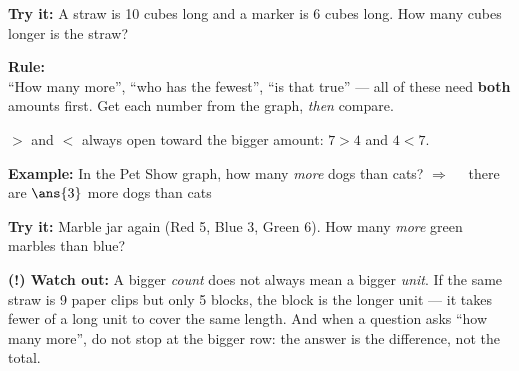 \documentclass[12pt]{article}
\begin{document}
\begin{tryitbox}
\textbf{Try it:} \quad A straw is 10 cubes long and a marker is 6 cubes long. How many
cubes longer is the straw?\\[2pt]
\end{tryitbox}


\begin{formulabox}
\textbf{Rule:}\\[3pt]
``How many more'', ``who has the fewest'', ``is that true'' --- all of these need
\textbf{both} amounts first. Get each number from the graph, \emph{then} compare.\par
$>$ and $<$ always open toward the bigger amount: $7 > 4$ and $4 < 7$.
\end{formulabox}

\begin{examplebox}
\textbf{Example:} \quad In the Pet Show graph, how many \emph{more} dogs than cats?
$\Rightarrow\quad$ there are $\ans{3}$ more dogs than cats
\end{examplebox}

\begin{tryitbox}
\textbf{Try it:} \quad Marble jar again (Red 5, Blue 3, Green 6). How many \emph{more}
green marbles than blue?\\[2pt]
\end{tryitbox}

\begin{watchoutbox}
\textbf{(!) Watch out:} A bigger \emph{count} does not always mean a bigger \emph{unit}.
If the same straw is 9 paper clips but only 5 blocks, the block is the longer unit --- it
takes fewer of a long unit to cover the same length. And when a question asks ``how many
more'', do not stop at the bigger row: the answer is the difference, not the total.
\end{watchoutbox}
\end{document}
